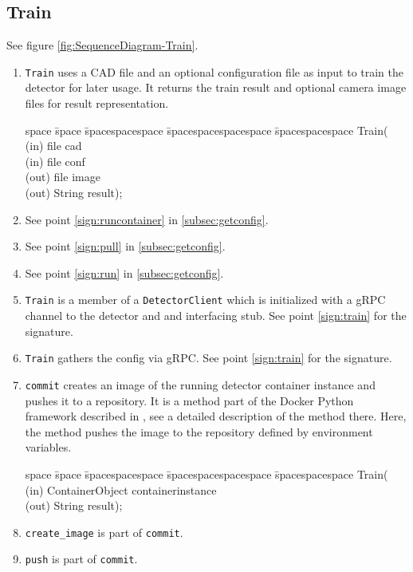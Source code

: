 \subsection{Train}
See figure \ref{fig:SequenceDiagram-Train}.
\begin{enumerate}
    \item \texttt{Train} uses a CAD file and an optional configuration file as input to train the detector for later usage. It returns the train result and optional camera image files for result representation.
        \begin{tabbing}
        space \= space \= spacespacespace \= spacespacespacespace \= spacespacespace \kill
        \>  Train(\\
        \>  \>  (in)	 \> 	file          \> cad\\
        \>  \>  (in)	 \> 	file          \> conf\\
        \>  \>  (out)	 \> 	file          \> image\\
        \>  \>  (out)	 \> 	String           \> result); 
        \end{tabbing}\label{sign:train}
    \item See point \ref{sign:runcontainer} in \ref{subsec:getconfig}.
    \item See point \ref{sign:pull} in \ref{subsec:getconfig}.
    \item See point \ref{sign:run} in \ref{subsec:getconfig}.
    \item \texttt{Train} is a member of a \texttt{DetectorClient} which is initialized with a gRPC channel to the detector and and interfacing stub. See point \ref{sign:train} for the signature.
    \item \texttt{Train} gathers the config via gRPC. See point \ref{sign:train} for the signature.
    \item \texttt{commit} creates an image of the running detector container instance and pushes it to a repository. It is a method part of the Docker Python framework described in \cite{LastvisitedMay4th2019DockerPython}, see a detailed description of the method there. Here, the method pushes the image to the repository defined by environment variables.
    \begin{tabbing}
    space \= space \= spacespacespace \= spacespacespacespace \= spacespacespace \kill
    \>  Train(\\
    \>  \>  (in)	 \> 	ContainerObject          \> containerinstance\\
    \>  \>  (out)	 \> 	String           \> result); 
    \end{tabbing}\label{sign:commit}
    \item \texttt{create_image} is part of \texttt{commit}.
    \item \texttt{push} is part of \texttt{commit}.
\end{enumerate}

